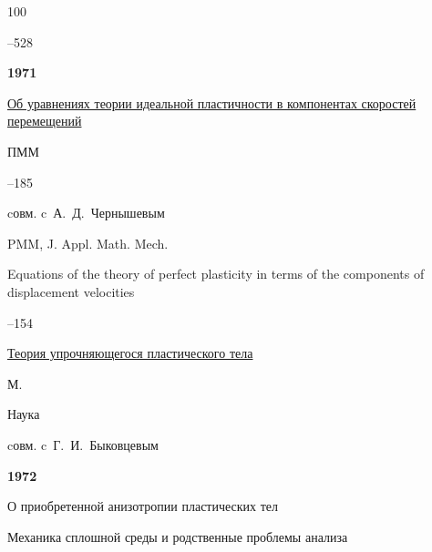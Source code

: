 \begin{thebibliography}{100}

--528 




\item[] \centerline{\bf 1971}




\paper \href{https://zbmath.org/?q=an:0244.73026}{Об уравнениях теории идеальной пластичности в компонентах скоростей перемещений}

\jour ПММ




–185 

\miscnote cовм. c~А.~Д.~Чернышевым


\transl


\jour PMM, J. Appl. Math. Mech. 

\paper Equations of the theory of perfect plasticity in terms of the components of displacement velocities


--154 








\book \href{http://www.worldcat.org/title/teorija-uprocnjajuscegosja-plasticeskogo-tela/oclc/68022236}{Теория упрочняющегося пластического тела}

\publaddr М.

\publ Наука



\miscnote cовм. c~Г.~И.~Быковцевым



\item[] \centerline{\bf 1972}




\paper О приобретенной анизотропии пластических тел 

\inbook Механика сплошной среды и родственные проблемы анализа


\end{thebibliography}
